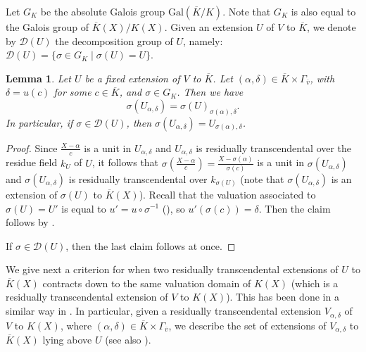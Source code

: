 \documentclass[10pt]{article}
\numberwithin{equation}{section}
\newtheorem{Lem}[equation]{Lemma}
\theoremstyle{definition}
\theoremstyle{definition}
\begin{document}
Let $G_K$ be the absolute Galois group $\text{Gal}(\overline K/K)$. Note that $G_K$ is also equal to the Galois group of $\overline K(X)/K(X)$.  
Given an extension $U$ of $V$ to $\overline{K}$, we denote by $\mathcal{D}(U)$ the decomposition group of $U$, 
namely: $\mathcal{D}(U)=\{\sigma\in G_K \mid \sigma(U)=U\}$.


\begin{Lem}\label{image rt}
Let $U$ be a fixed extension of $V$ to $\overline{K}$.
Let $(\alpha,\delta)\in\overline{K}\times\Gamma_{\overline{v}}$, 
with $\delta=u(c)$ for some $c\in \overline{K}$, and $\sigma\in G_K$.  Then we have
$$\sigma(U_{\alpha,\delta})=\sigma(U)_{\sigma(\alpha),\delta}.$$
In particular, if $\sigma\in \mathcal{D}(U)$, then $\sigma(U_{\alpha,\delta})=U_{\sigma(\alpha),\delta}$.
\end{Lem}
\begin{proof}
Since $\frac{X-\alpha}{c}$ is a unit in $U_{\alpha,\delta}$ and  $U_{\alpha,\delta}$ is residually transcendental over the residue field $k_U$ of $U$, 
it follows that $\sigma\left(\frac{X-\alpha}{c}\right)=\frac{X-\sigma(\alpha)}{\sigma(c)}$ is a unit in $\sigma(U_{\alpha,\delta})$ 
and $\sigma(U_{\alpha,\delta})$ is residually transcendental over $k_{\sigma(U)}$ (note that $\sigma(U_{\alpha,\delta})$ is an extension of $\sigma(U)$ to $\overline K(X)$).
Recall that the valuation associated to $\sigma(U)=U'$ is equal to $u'=u\circ\sigma^{-1}$ (\cite[Proposition 3.2.16, (1)]{EngPre}), so $u'(\sigma(c))=\delta$.
Then the claim follows by \cite[Chapt. VI, \S 10, Proposition 2]{Bourb}. 

If $\sigma\in \mathcal{D}(U)$, then the last claim follows at once. 
\end{proof}


We give next a criterion for when two residually transcendental extensions of $U$ to $\overline{K}(X)$ contracts down to the same valuation domain of $K(X)$ 
(which is a residually transcendental extension of $V$ to $K(X)$).
This has been done in a similar way in \cite{NN}.
In particular, given a residually transcendental extension $V_{\alpha,\delta}$ of $V$ to $K(X)$,  where $(\alpha,\delta)\in \overline{K}\times\Gamma_{\overline v}$, 
we describe the set of extensions of $V_{\alpha,\delta}$  to $\overline{K}(X)$ lying above $U$  (see also \cite[Theorem 2.2]{APZMinimal}). 
\end{document}
